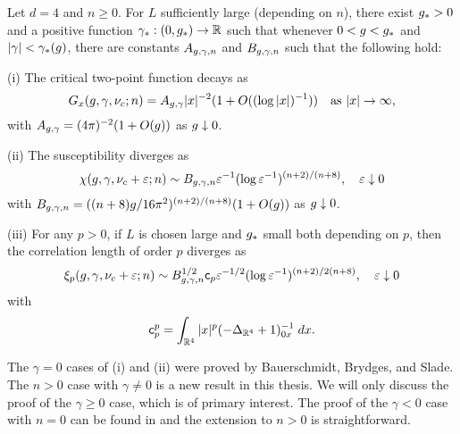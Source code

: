 \begin{theorem} \label{thm:suscept}
  Let $d = 4$ and $n \ge 0$. For $L$ sufficiently large (depending on $n$),
  there exist $g_* > 0$
  and a positive function $\gamma_* : (0, g_*) \rightarrow {\mathbb R}$
  such that whenever $0 < g < g_*$ and $|\gamma| < \gamma_*(g)$,
  there are constants $A_{g,\gamma,n}$ and $B_{g,\gamma,n}$ such that the following hold:

  \smallskip\noindent
  (i)
  The critical two-point function decays as
  \begin{equation}
    G_x(g,\gamma,\nu_c; n)
        =
    A_{g,\gamma} |x|^{-2} (1 + O((\log |x|)^{-1}))
        \quad
    \text{as $|x|\rightarrow\infty$},
  \end{equation}
  with $A_{g,\gamma} = (4 \pi)^{-2} (1 + O(g))$ as $g \downarrow 0$.

  \smallskip\noindent
  (ii)
  The susceptibility diverges as
  \begin{equation} \label{e:chieps-asympt}
    \chi(g, \gamma, \nu_c + \varepsilon; n)
      \sim B_{g,\gamma,n} \varepsilon^{-1} (\log \varepsilon^{-1})^{(n+2)/(n+8)},
    \quad \varepsilon\downarrow 0
  \end{equation}
  with $B_{g,\gamma,n} = ((n + 8) g / 16\pi^2)^{(n+2)/(n+8)} (1 + O(g))$
  as $g \downarrow 0$.

  \smallskip\noindent
  (iii) For any $p >0$, if $L$ is chosen large and $g_*$ small both depending on $p$,
  then the correlation length of order $p$ diverges as
  \begin{equation} \label{e:xieps-asympt}
    \xi_p(g, \gamma, \nu_c + \varepsilon; n)
     \sim B_{g,\gamma,n}^{1/2} {\sf c}_p \varepsilon^{-1/2} (\log \varepsilon^{-1})^{(n+2)/2(n+8)},
    \quad \varepsilon\downarrow 0
  \end{equation}
  with
  \begin{equation}
  {\sf c}_p^p = \int_{{\mathbb R}^4} |x|^p (-\Delta_{{\mathbb R}^4} + 1)^{-1}_{0x} \; dx.
  \end{equation}
\end{theorem}

The $\gamma = 0$ cases of (i) and (ii) were proved by Bauerschmidt, Brydges, and
Slade. The $n > 0$ case with $\gamma \ne 0$ is a new result in this thesis. We
will only discuss the proof of the $\gamma \ge 0$ case, which is of primary
interest. The proof of the $\gamma < 0$ case with $n = 0$ can be found in
\REF and the extension to $n > 0$ is straightforward.


